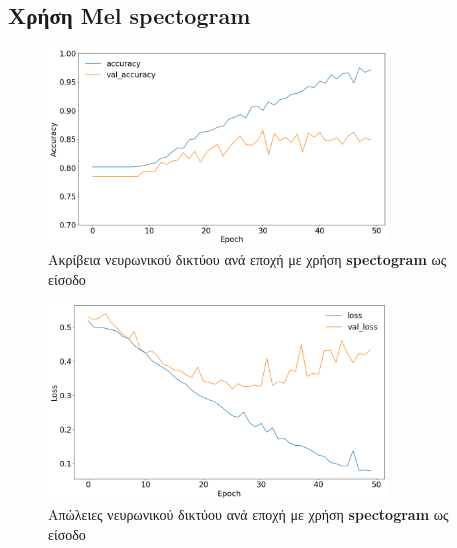 \documentclass[../main.tex]{subfiles}
\begin{document}
\subsection{Χρήση Mel spectogram}
\begin{figure}[H]
	\center
	\includegraphics[width=0.8\textwidth]{../images/accuracy_spectogram.png}
	\caption{Ακρίβεια νευρωνικού δικτύου ανά εποχή με χρήση \textbf{spectogram} ως
		είσοδο}
	\label{accuracy_spectogram}
\end{figure}
\begin{figure}[H]
	\center
	\includegraphics[width=0.8\textwidth]{../images/loss_spectogram.png}
	\caption{Απώλειες νευρωνικού δικτύου ανά εποχή με χρήση \textbf{spectogram} ως
		είσοδο}
	\label{loss_spectogram}
\end{figure}
\end{document}

